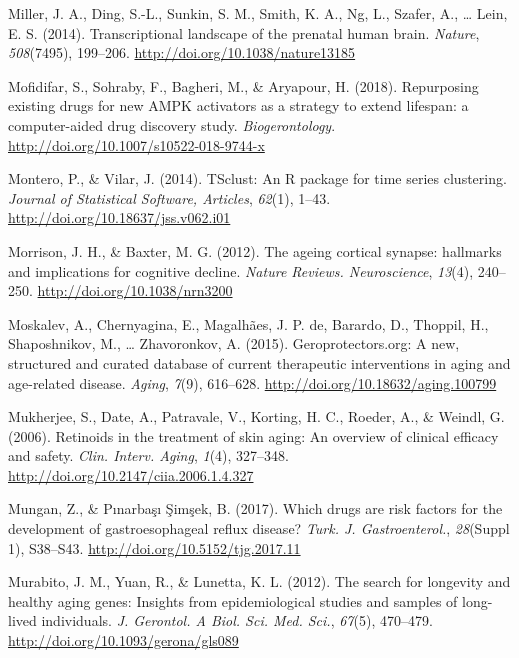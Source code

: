 \documentclass[12pt,twoside]{unicam}
\begin{document}
\begin{cslreferences}
\leavevmode\hypertarget{ref-Miller2014}{}%
Miller, J. A., Ding, S.-L., Sunkin, S. M., Smith, K. A., Ng, L., Szafer, A., \ldots{} Lein, E. S. (2014). Transcriptional landscape of the prenatal human brain. \emph{Nature}, \emph{508}(7495), 199--206. \url{http://doi.org/10.1038/nature13185}

\leavevmode\hypertarget{ref-Mofidifar2018}{}%
Mofidifar, S., Sohraby, F., Bagheri, M., \& Aryapour, H. (2018). Repurposing existing drugs for new AMPK activators as a strategy to extend lifespan: a computer-aided drug discovery study. \emph{Biogerontology}. \url{http://doi.org/10.1007/s10522-018-9744-x}

\leavevmode\hypertarget{ref-Montero2014}{}%
Montero, P., \& Vilar, J. (2014). TSclust: An R package for time series clustering. \emph{Journal of Statistical Software, Articles}, \emph{62}(1), 1--43. \url{http://doi.org/10.18637/jss.v062.i01}

\leavevmode\hypertarget{ref-Morrison2012}{}%
Morrison, J. H., \& Baxter, M. G. (2012). The ageing cortical synapse: hallmarks and implications for cognitive decline. \emph{Nature Reviews. Neuroscience}, \emph{13}(4), 240--250. \url{http://doi.org/10.1038/nrn3200}

\leavevmode\hypertarget{ref-Moskalev2015}{}%
Moskalev, A., Chernyagina, E., Magalhães, J. P. de, Barardo, D., Thoppil, H., Shaposhnikov, M., \ldots{} Zhavoronkov, A. (2015). Geroprotectors.org: A new, structured and curated database of current therapeutic interventions in aging and age-related disease. \emph{Aging}, \emph{7}(9), 616--628. \url{http://doi.org/10.18632/aging.100799}

\leavevmode\hypertarget{ref-Mukherjee2006}{}%
Mukherjee, S., Date, A., Patravale, V., Korting, H. C., Roeder, A., \& Weindl, G. (2006). Retinoids in the treatment of skin aging: An overview of clinical efficacy and safety. \emph{Clin. Interv. Aging}, \emph{1}(4), 327--348. \url{http://doi.org/10.2147/ciia.2006.1.4.327}

\leavevmode\hypertarget{ref-Mungan2017}{}%
Mungan, Z., \& Pınarbaşı Şimşek, B. (2017). Which drugs are risk factors for the development of gastroesophageal reflux disease? \emph{Turk. J. Gastroenterol.}, \emph{28}(Suppl 1), S38--S43. \url{http://doi.org/10.5152/tjg.2017.11}

\leavevmode\hypertarget{ref-Murabito2012}{}%
Murabito, J. M., Yuan, R., \& Lunetta, K. L. (2012). The search for longevity and healthy aging genes: Insights from epidemiological studies and samples of long-lived individuals. \emph{J. Gerontol. A Biol. Sci. Med. Sci.}, \emph{67}(5), 470--479. \url{http://doi.org/10.1093/gerona/gls089}


\end{cslreferences}
\end{document}
